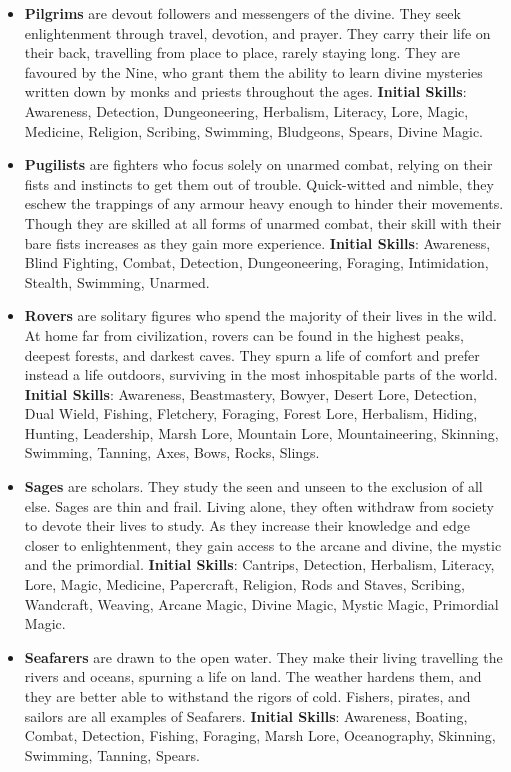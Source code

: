 \begin{itemize}
\item {\bf Pilgrims} are devout followers and messengers of the divine.  
They seek enlightenment through travel, devotion, and prayer.  They carry 
their life on their back, travelling from place to place, rarely staying 
long.  They are favoured by the Nine, who grant them the ability to learn
divine mysteries written down by monks and priests throughout the ages.
\textbf{Initial Skills}: Awareness, Detection, Dungeoneering, Herbalism,
Literacy, Lore, Magic, Medicine, Religion, Scribing, Swimming, Bludgeons, 
Spears, Divine Magic.

\item {\bf Pugilists} are fighters who focus solely on unarmed combat, 
relying on their fists and instincts to get them out of trouble.  
Quick-witted and nimble, they eschew the trappings of any armour heavy 
enough to hinder their movements.  Though they are skilled at all forms of
unarmed combat, their skill with their bare fists increases as they gain
more experience.  \textbf{Initial Skills}: Awareness, Blind Fighting, 
Combat, Detection, Dungeoneering, Foraging, Intimidation, Stealth, 
Swimming, Unarmed.

\item {\bf Rovers} are solitary figures who spend the majority of their 
lives in the wild.  At home far from civilization, rovers can be found in 
the highest peaks, deepest forests, and darkest caves.  They spurn a life 
of comfort and prefer instead a life outdoors, surviving in the most 
inhospitable parts of the world.  \textbf{Initial Skills}: Awareness,
Beastmastery, Bowyer, Desert Lore, Detection, Dual Wield, Fishing, 
Fletchery, Foraging, Forest Lore, Herbalism, Hiding, Hunting, Leadership, 
Marsh Lore, Mountain Lore, Mountaineering, Skinning, Swimming, Tanning, 
Axes, Bows, Rocks, Slings.

\item {\bf Sages} are scholars.  They study the seen and unseen to the 
exclusion of all else.  Sages are thin and frail.  Living alone, they often
withdraw from society to devote their lives to study.  As they increase 
their knowledge and edge closer to enlightenment, they gain access to the 
arcane and divine, the mystic and the primordial.  \textbf{Initial Skills}:
Cantrips, Detection, Herbalism, Literacy, Lore, Magic, Medicine, Papercraft,
Religion, Rods and Staves, Scribing, Wandcraft, Weaving, Arcane Magic, 
Divine Magic, Mystic Magic, Primordial Magic.

\item {\bf Seafarers} are drawn to the open water.  They make their living 
travelling the rivers and oceans, spurning a life on land.  The weather 
hardens them, and they are better able to withstand the rigors of cold.  
Fishers, pirates, and sailors are all examples of Seafarers.
\textbf{Initial Skills}: Awareness, Boating, Combat, Detection, Fishing,
Foraging, Marsh Lore, Oceanography, Skinning, Swimming, Tanning, Spears.


\end{itemize}
